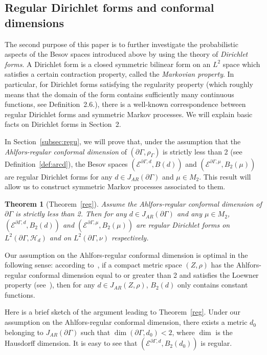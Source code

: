 \documentclass[AHL,Unicode,longabstracts,published]{cedram}
\newcommand{\ce}{\mathcal{E}}
\newcommand{\ch}{\mathcal{H}}
\newtheorem{innercustomthm}{Theorem}
\begin{document}
\subsection*{Regular Dirichlet forms and conformal dimensions}

The second purpose of this paper is to further investigate the probabilistic aspects of the Besov spaces introduced above by using the theory of \emph{Dirichlet forms}. A Dirichlet form is a closed symmetric bilinear form on an $L^2$ space which satisfies a certain contraction property, called the \emph{Markovian property}. In particular, for Dirichlet forms satisfying the regularity property (which roughly means that the domain of the form contains sufficiently many continuous functions, see Definition~2.6.), there is a well-known correspondence between regular Dirichlet forms and symmetric Markov processes. We will explain basic facts on Dirichlet forms in Section~2.

In Section~\ref{subsec:regu}, we will prove that, under the assumption that the \emph{Ahlfors-regular conformal dimension} of $(\partial\Gamma,\rho_{\Gamma})$ is strictly less than 2 (see Definition~\ref{def:arcd}), the Besov spaces $(\ce^{\partial\Gamma,d},B(d))$ and $(\ce^{\partial\Gamma,\mu},B_2(\mu))$ are regular Dirichlet forms for any $d\in J_{AR}(\partial\Gamma)$ and $\mu\in M_2$. This result will allow us to construct symmetric Markov processes associated to them.

\begin{innercustomthm}[{Theorem~\ref{reg}}]
Assume the Ahlfors-regular conformal dimension of $\partial\Gamma$ is strictly less than 2. Then for any $d\in J_{AR}(\partial\Gamma)$ and any $\mu\in M_2$, $(\ce^{\partial\Gamma,d},B_2(d))$ and $(\ce^{\partial\Gamma,\mu},B_2(\mu))$ are regular Dirichlet forms on $L^2(\partial\Gamma,\ch_{d})$ and on $L^2(\partial\Gamma,\nu)$ respectively.
\end{innercustomthm}
Our assumption on the Ahlfors-regular conformal dimension is optimal in the following sense: according to~\cite[Theorem~0.3]{BP}, if a compact metric space $(Z,\rho)$ has the Ahlfors-regular conformal dimension equal to or greater than 2 and satisfies the Loewner property (see~\cite[Chapter~8]{Hei}), then for any $d\in J_{AR}(Z,\rho)$, $B_2(d)$ only contains constant functions.

Here is a brief sketch of the argument leading to Theorem~\ref{reg}. Under our assumption on the Ahlfors-regular conformal dimension, there exists a metric $d_0$ belonging to $J_{AR}(\partial\Gamma)$ such that $\dim(\partial\Gamma,d_{0})<2$, where $\dim$ is the Hausdorff dimension. It is easy to see that $(\ce^{\partial\Gamma,d},B_2(d_0))$ is regular.
\end{document}
